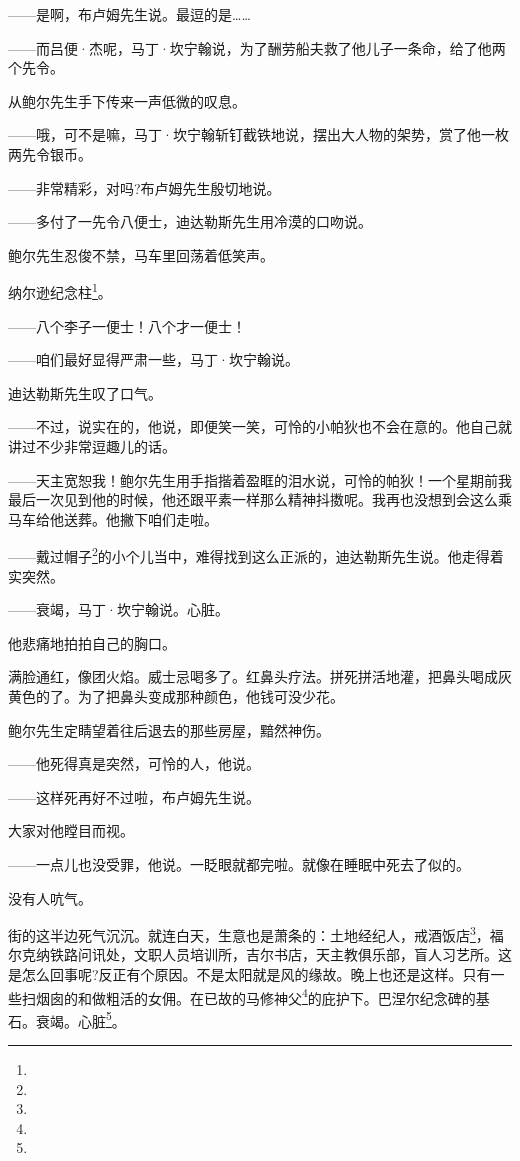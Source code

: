 \par ——是啊，布卢姆先生说。最逗的是……
\par ——而吕便·杰呢，马丁·坎宁翰说，为了酬劳船夫救了他儿子一条命，给了他两个先令。
\par 从鲍尔先生手下传来一声低微的叹息。
\par ——哦，可不是嘛，马丁·坎宁翰斩钉截铁地说，摆出大人物的架势，赏了他一枚两先令银币。
\par ——非常精彩，对吗?布卢姆先生殷切地说。
\par ——多付了一先令八便士，迪达勒斯先生用冷漠的口吻说。
\par 鲍尔先生忍俊不禁，马车里回荡着低笑声。
\par 纳尔逊纪念柱\footnote{}。
\par ——八个李子一便士！八个才一便士！
\par ——咱们最好显得严肃一些，马丁·坎宁翰说。
\par 迪达勒斯先生叹了口气。
\par ——不过，说实在的，他说，即便笑一笑，可怜的小帕狄也不会在意的。他自己就讲过不少非常逗趣儿的话。
\par ——天主宽恕我！鲍尔先生用手指揩着盈眶的泪水说，可怜的帕狄！一个星期前我最后一次见到他的时候，他还跟平素一样那么精神抖擞呢。我再也没想到会这么乘马车给他送葬。他撇下咱们走啦。
\par ——戴过帽子\footnote{}的小个儿当中，难得找到这么正派的，迪达勒斯先生说。他走得着实突然。
\par ——衰竭，马丁·坎宁翰说。心脏。
\par 他悲痛地拍拍自己的胸口。
\par 满脸通红，像团火焰。威士忌喝多了。红鼻头疗法。拼死拼活地灌，把鼻头喝成灰黄色的了。为了把鼻头变成那种颜色，他钱可没少花。
\par 鲍尔先生定睛望着往后退去的那些房屋，黯然神伤。
\par ——他死得真是突然，可怜的人，他说。
\par ——这样死再好不过啦，布卢姆先生说。
\par 大家对他瞠目而视。
\par ——一点儿也没受罪，他说。一眨眼就都完啦。就像在睡眠中死去了似的。
\par 没有人吭气。
\par 街的这半边死气沉沉。就连白天，生意也是萧条的：土地经纪人，戒酒饭店\footnote{}，福尔克纳铁路问讯处，文职人员培训所，吉尔书店，天主教俱乐部，盲人习艺所。这是怎么回事呢?反正有个原因。不是太阳就是风的缘故。晚上也还是这样。只有一些扫烟囱的和做粗活的女佣。在已故的马修神父\footnote{}的庇护下。巴涅尔纪念碑的基石。衰竭。心脏\footnote{}。
